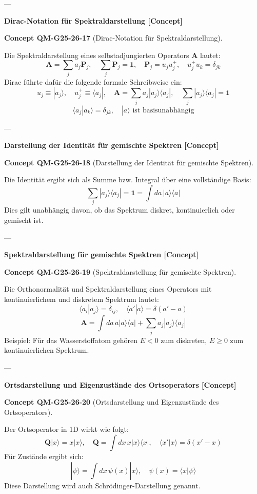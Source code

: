 \documentclass[10pt, letterpaper]{article}
\newcommand{\CustomHeading}[3]{%
  \par\medskip\noindent%
  \textbf{#1 #2} \textnormal{(#3)}.\enskip%
}
\newenvironment{CONC}[2]{\begin{unitbox}\CustomHeading{Concept}{#1}{#2}}{\end{unitbox}}
\begin{document}
---

\textbf{Dirac-Notation für Spektraldarstellung [Concept]}

\begin{CONC}{QM-G25-26-17}{Dirac-Notation für Spektraldarstellung}
Die Spektraldarstellung eines selbstadjungierten Operators $\mathbf{A}$ lautet:
\[
\mathbf{A} = \sum_j a_j \mathbf{P}_j, \quad \sum_j \mathbf{P}_j = \mathbf{1}, \quad \mathbf{P}_j = u_j u_j^+, \quad u_j^+ u_k = \delta_{jk}
\]
Dirac führte dafür die folgende formale Schreibweise ein:
\[
u_j \equiv |a_j\rangle, \quad u_j^+ \equiv \langle a_j|, \quad \mathbf{A} = \sum_j a_j |a_j\rangle\langle a_j|, \quad \sum_j |a_j\rangle\langle a_j| = \mathbf{1}
\]
\[
\langle a_j | a_k \rangle = \delta_{jk}, \quad |a\rangle \text{ ist basisunabhängig}
\]
\end{CONC}

---

\textbf{Darstellung der Identität für gemischte Spektren [Concept]}

\begin{CONC}{QM-G25-26-18}{Darstellung der Identität für gemischte Spektren}
Die Identität ergibt sich als Summe bzw. Integral über eine vollständige Basis:
\[
\sum_j |a_j\rangle\langle a_j| = \mathbf{1} = \int da\, |a\rangle\langle a|
\]
Dies gilt unabhängig davon, ob das Spektrum diskret, kontinuierlich oder gemischt ist.
\end{CONC}

---

\textbf{Spektraldarstellung für gemischte Spektren [Concept]}

\begin{CONC}{QM-G25-26-19}{Spektraldarstellung für gemischte Spektren}
Die Orthonormalität und Spektraldarstellung eines Operators mit kontinuierlichem und diskretem Spektrum lautet:
\[
\langle a_i | a_j \rangle = \delta_{ij}, \quad \langle a' | a \rangle = \delta(a' - a)
\]
\[
\mathbf{A} = \int da\, a |a\rangle\langle a| + \sum_j a_j |a_j\rangle\langle a_j|
\]
Beispiel: Für das Wasserstoffatom gehören $E<0$ zum diskreten, $E \geq 0$ zum kontinuierlichen Spektrum.
\end{CONC}

---

\textbf{Ortsdarstellung und Eigenzustände des Ortsoperators [Concept]}

\begin{CONC}{QM-G25-26-20}{Ortsdarstellung und Eigenzustände des Ortsoperators}
Der Ortsoperator in 1D wirkt wie folgt:
\[
\mathbf{Q}|x\rangle = x|x\rangle, \quad \mathbf{Q} = \int dx\, x |x\rangle\langle x|, \quad \langle x' | x \rangle = \delta(x'-x)
\]
Für Zustände ergibt sich:
\[
|\psi\rangle = \int dx\, \psi(x) |x\rangle, \quad \psi(x) = \langle x | \psi \rangle
\]
Diese Darstellung wird auch Schrödinger-Darstellung genannt.
\end{CONC}
\end{document}
